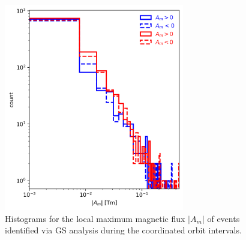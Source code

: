 \begin{figure}
    \centering
    \includegraphics[width=0.7\textwidth]{Figures/Histograms/Asplit_coordinated.png}
    \caption[Histogram of poloidal magnetic ﬂux per unit length from coordinated analysis]{Histograms for the local maximum magnetic flux $|A_m|$ of events identified via GS analysis during the coordinated orbit intervals.}
    \label{fig:histogram-Asplit-coordinated}
\end{figure}



